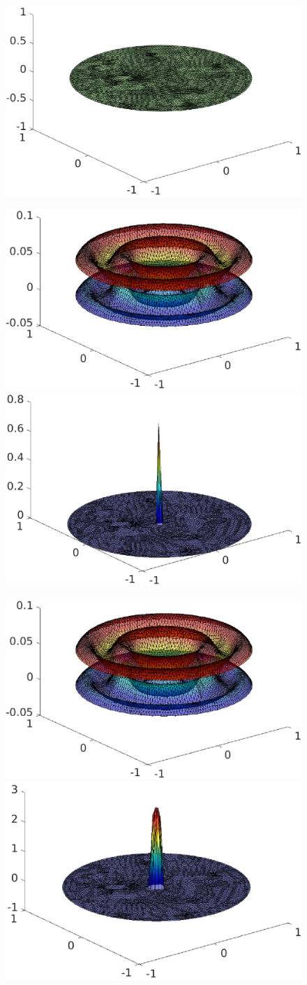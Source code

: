 \begin{frame}
\begin{overprint}
\begin{figure}
\quad
\includegraphics[width=0.48 \textwidth]{fig_article_chap_2/test_case_128/fig_lambda_hmax0,09_Dt0,001_tt02.eps} 
\end{figure}
\begin{figure}
\includegraphics[width=0.48 \textwidth]{fig_article_chap_2/test_case_128/fig_u1u2_hmax0,09_Dt0,001_tt05.eps} 
\quad
\includegraphics[width=0.48 \textwidth]{fig_article_chap_2/test_case_128/fig_lambda_hmax0,09_Dt0,001_tt05.eps}
\end{figure}
\begin{figure}
\includegraphics[width=0.48 \textwidth]{fig_article_chap_2/test_case_128/fig_u1u2_hmax0,09_Dt0,001_tt06.eps} 
\quad
\includegraphics[width=0.48 \textwidth]{fig_article_chap_2/test_case_128/fig_lambda_hmax0,09_Dt0,001_tt06.eps} 

\end{figure}
\end{overprint}
\end{frame}
